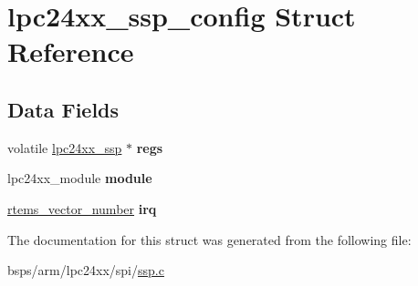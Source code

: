 \hypertarget{structlpc24xx__ssp__config}{}\section{lpc24xx\+\_\+ssp\+\_\+config Struct Reference}
\label{structlpc24xx__ssp__config}
\subsection*{Data Fields}
\begin{DoxyCompactItemize}
\item 
\mbox{\label{structlpc24xx__ssp__config_acf76cb71cc20b491373b20802da30db2}} 
volatile \mbox{\hyperlink{structlpc24xx__ssp}{lpc24xx\+\_\+ssp}} $\ast$ {\bfseries regs}
\item 
\mbox{\label{structlpc24xx__ssp__config_ad0074b17ac28a2178d0218a2b34e38a9}} 
lpc24xx\+\_\+module {\bfseries module}
\item 
\mbox{\label{structlpc24xx__ssp__config_a930fc04d86793c2b5306576724b59ad7}} 
\mbox{\hyperlink{group__ClassicINTR_ga3e434c197d99f128e78cae4d9358bd8b}{rtems\+\_\+vector\+\_\+number}} {\bfseries irq}
\end{DoxyCompactItemize}


The documentation for this struct was generated from the following file\+:\begin{DoxyCompactItemize}
\item 
bsps/arm/lpc24xx/spi/\mbox{\hyperlink{ssp_8c}{ssp.\+c}}\end{DoxyCompactItemize}
